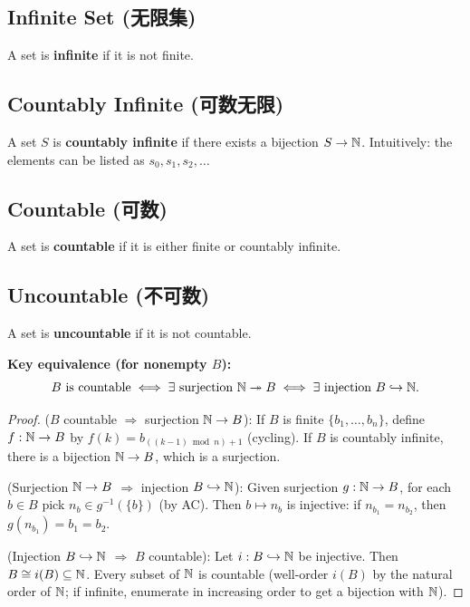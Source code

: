 \documentclass{article}
\begin{document}
\subsection{Infinite Set (无限集)}\label{def:infinite}
A set is \textbf{infinite} if it is not finite.

\subsection{Countably Infinite (可数无限)}\label{def:countably-infinite}
A set $S$ is \textbf{countably infinite} if there exists a bijection
$S \to \mathbb{N}$. Intuitively: the elements can be listed as $s_0, s_1, s_2, \ldots$

\subsection{Countable (可数)}\label{def:countable}
A set is \textbf{countable} if it is either finite or countably infinite.

\subsection{Uncountable (不可数)}\label{def:uncountable}
A set is \textbf{uncountable} if it is not countable.

\textbf{Key equivalence (for nonempty $B$):}
\[
  B \text{ is countable} \iff \exists\text{ surjection } \mathbb{N}
  \twoheadrightarrow B \iff \exists\text{ injection } B \hookrightarrow \mathbb{N}.
\]

\begin{proof}
  ($B$ countable $\Rightarrow$ surjection $\mathbb{N} \to B$): If $B$ is
  finite $\{b_1, \ldots, b_n\}$,
  define $f : \mathbb{N} \to B$ by $f(k) = b_{((k-1) \bmod n) + 1}$ (cycling).
  If $B$ is countably infinite, there is a bijection $\mathbb{N} \to B$,
  which is a surjection.

  (Surjection $\mathbb{N} \to B$ $\Rightarrow$ injection $B \hookrightarrow \mathbb{N}$):
  Given surjection $g : \mathbb{N} \to B$, for each $b \in B$ pick $n_b \in
  g^{-1}(\{b\})$
  (by AC). Then $b \mapsto n_b$ is injective: if $n_{b_1} = n_{b_2}$,
  then $g(n_{b_1}) = b_1 = b_2$.

  (Injection $B \hookrightarrow \mathbb{N}$ $\Rightarrow$ $B$ countable):
  Let $i : B \hookrightarrow \mathbb{N}$ be injective. Then $B \cong i(B) \subseteq \mathbb{N}$.
  Every subset of $\mathbb{N}$ is countable (well-order $i(B)$ by the natural
    order of $\mathbb{N}$;
  if infinite, enumerate in increasing order to get a bijection with $\mathbb{N}$).
\end{proof}
\end{document}
